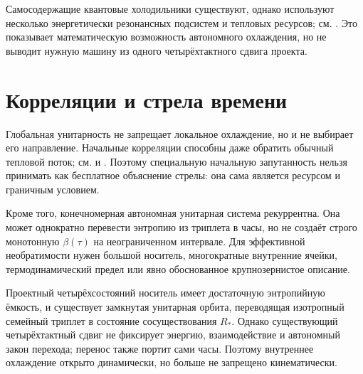 Самосодержащие квантовые холодильники существуют, однако используют
несколько энергетически резонансных подсистем и тепловых ресурсов; см.
. Это показывает математическую
возможность автономного охлаждения, но не выводит нужную машину из одного
четырёхтактного сдвига проекта.

\section{Корреляции и стрела времени}

Глобальная унитарность не запрещает локальное охлаждение, но и не выбирает
его направление. Начальные корреляции способны даже обратить обычный
тепловой поток; см.  и
. Поэтому специальную начальную
запутанность нельзя принимать как бесплатное объяснение стрелы: она сама
является ресурсом и граничным условием.

Кроме того, конечномерная автономная унитарная система рекуррентна. Она
может однократно перевести энтропию из триплета в часы, но не создаёт строго
монотонную $\beta(\tau)$ на неограниченном интервале. Для эффективной
необратимости нужен большой носитель, многократные внутренние ячейки,
термодинамический предел или явно обоснованное крупнозернистое описание.

\begin{theorem}
Проектный четырёхсостояний носитель имеет достаточную энтропийную ёмкость,
и существует замкнутая унитарная орбита, переводящая изотропный семейный
триплет в состояние сосуществования $R_*$. Однако существующий
четырёхтактный сдвиг не фиксирует энергию, взаимодействие и автономный
закон перехода; перенос также портит сами часы. Поэтому внутреннее
охлаждение открыто динамически, но больше не запрещено кинематически.
\end{theorem}

